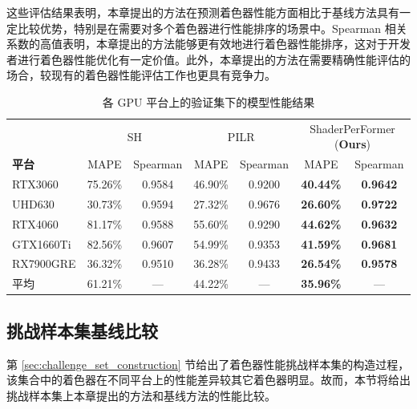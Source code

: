 这些评估结果表明，{\amend 本章提出的方法}在预测着色器性能方面相比于基线方法具有一定比较优势，特别是在需要对多个着色器进行性能排序的场景中。Spearman 相关系数的高值表明，{\amend 本章提出的方法}能够更有效地进行着色器性能排序，这对于开发者进行着色器性能优化有一定价值。此外，{\amend 本章提出的方法}在需要精确性能评估的场合，较现有的着色器性能评估工作也更具有竞争力。

\begin{table}[h]
    \centering
    \caption{各 GPU 平台上的验证集下的模型性能结果}
    \label{table:mainResults}
    \begin{tabular}{l|cccccc}
    \toprule
        ~  & \multicolumn{2}{c}{SH} & \multicolumn{2}{c}{PILR} & \multicolumn{2}{c}{ShaderPerFormer (\textbf{Ours})} \\ 
        \textbf{平台}          & MAPE & Spearman & MAPE & Spearman & MAPE & Spearman \\
    \midrule
        RTX3060 &  75.26\% & 0.9584 &  46.90\% & 0.9200 & \textbf{40.44\%} & \textbf{0.9642} \\
        UHD630 &  30.73\% & 0.9594 &  27.32\% & 0.9676 & \textbf{26.60\%} & \textbf{0.9722} \\
        RTX4060 &  81.17\% & 0.9588 &  55.60\% & 0.9290 & \textbf{44.62\%} & \textbf{0.9632} \\
        GTX1660Ti &  82.56\% & 0.9607 &  54.99\% & 0.9353 & \textbf{41.59\%} & \textbf{0.9681} \\
        RX7900GRE &  36.32\% & 0.9510 &  36.28\% & 0.9433 & \textbf{26.54\%} & \textbf{0.9578} \\
    \midrule
        平均 & 61.21\% & --- & 44.22\% & --- & \textbf{35.96\%} & --- \\
    \bottomrule
    \end{tabular}
\end{table}

\subsection{{\added 挑战样本集基线比较}}

{\added 第 \ref{sec:challenge_set_construction} 节给出了着色器性能挑战样本集的构造过程，该集合中的着色器在不同平台上的性能差异较其它着色器明显。故而，本节将给出挑战样本集上本章提出的方法和基线方法的性能比较。}

